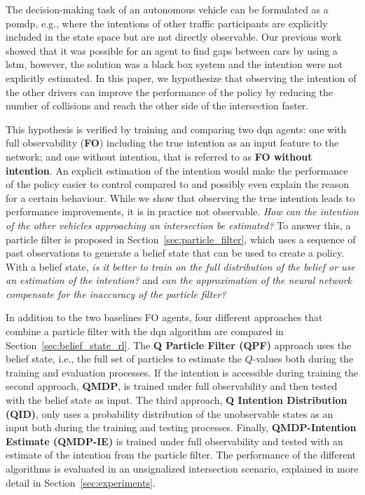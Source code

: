 	The decision-making task of an autonomous vehicle can be formulated as a \gls{pomdp}, e.g., where the intentions of other traffic participants are explicitly included in the state space but are not directly observable. Our previous work \cite{Tram2018} showed that it was possible for an agent to find gaps between cars by using a \gls{lstm}, however, the solution was a black box system and the intention were not explicitly estimated. In this paper, we hypothesize that observing the intention of the other drivers can improve the performance of the policy by reducing the number of collisions and reach the other side of the intersection faster. 
	
	This hypothesis is verified by training and comparing two \gls{dqn} agents: one with full observability (\textbf{FO}) including the true intention as an input feature to the network; and one without intention, that is referred to as \textbf{FO without intention}. An explicit estimation of the intention would make the performance of the policy easier to control compared to \cite{Tram2018} and possibly even explain the reason for a certain behaviour. While we show that observing the true intention leads to performance improvements, it is in practice not observable. \textit{How can the intention of the other vehicles approaching an intersection be estimated?} To answer this, a particle filter is proposed in Section~\ref{sec:particle_filter}, which uses a sequence of past observations to generate a belief state that can be used to create a policy. With a belief state, \textit{is it better to train on the full distribution of the belief or use an estimation of the intention?} and \textit{can the approximation of the neural network compensate for the inaccuracy of the particle filter?}
	
	In addition to the two baselines FO agents, four different approaches that combine a particle filter with the \gls{dqn} algorithm are compared in Section~\ref{sec:belief_state_rl}. The \textbf{Q Particle Filter (QPF)} approach uses the belief state, i.e., the full set of particles to estimate the $Q$-values both during the training and evaluation processes. 
	If the intention is accessible during training the second approach, \textbf{QMDP}, is trained under full observability and then tested with the belief state as input. The third approach, \textbf{Q Intention Distribution (QID)}, only uses a probability distribution of the unobservable states as an input both during the training and testing processes. Finally, \textbf{QMDP-Intention Estimate (QMDP-IE)} is trained under full observability and tested with an estimate of the intention from the particle filter. 
	The performance of the different algorithms is evaluated in an unsignalized intersection scenario, explained in more detail in Section~\ref{sec:experiments}.
	

